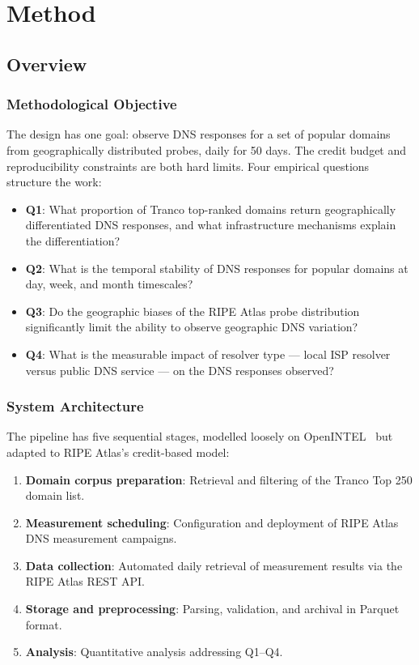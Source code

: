 \chapter{Method}
\label{ch:method}

\section{Overview}
\label{sec:3.1}

\subsection{Methodological Objective}
\label{subsec:3.1.1}

The design has one goal: observe \ac{DNS} responses for a set of popular domains from geographically distributed probes, daily for 50 days. The credit budget and reproducibility constraints are both hard limits. Four empirical questions structure the work:

\begin{itemize}
  \item \textbf{Q1}: What proportion of Tranco top-ranked domains return geographically differentiated \ac{DNS} responses, and what infrastructure mechanisms explain the differentiation?
  \item \textbf{Q2}: What is the temporal stability of \ac{DNS} responses for popular domains at day, week, and month timescales?
  \item \textbf{Q3}: Do the geographic biases of the RIPE Atlas probe distribution significantly limit the ability to observe geographic \ac{DNS} variation?
  \item \textbf{Q4}: What is the measurable impact of resolver type --- local \ac{ISP} resolver versus public \ac{DNS} service --- on the \ac{DNS} responses observed?
\end{itemize}

\subsection{System Architecture}
\label{subsec:3.1.2}

The pipeline has five sequential stages, modelled loosely on OpenINTEL~\cite{vanRijswijk2016} but adapted to RIPE Atlas's credit-based model:

\begin{enumerate}
  \item \textbf{Domain corpus preparation}: Retrieval and filtering of the Tranco Top 250 domain list.
  \item \textbf{Measurement scheduling}: Configuration and deployment of RIPE Atlas \ac{DNS} measurement campaigns.
  \item \textbf{Data collection}: Automated daily retrieval of measurement results via the RIPE Atlas REST API.
  \item \textbf{Storage and preprocessing}: Parsing, validation, and archival in Parquet format.
  \item \textbf{Analysis}: Quantitative analysis addressing Q1--Q4.
\end{enumerate}

